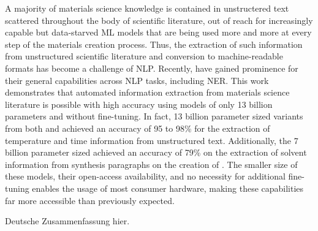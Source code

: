 \label{chap:abstract}

A majority of materials science knowledge is contained in unstructered text scattered throughout the body of scientific literature, out of reach for increasingly capable but data-starved \acrlong{ML} models that are being used more and more at every step of the materials creation process.
Thus, the extraction of such information from unstructured scientific literature and conversion to machine-readable formats has become a challenge of \acrlong{NLP}.
Recently,  have gained prominence for their general capabilities across \acrlong{NLP} tasks, including \acrlong{NER}.
This work demonstrates that automated information extraction from materials science literature is possible with high accuracy using models of only 13 billion parameters and without fine-tuning.
In fact, 13 billion parameter sized variants from both  and  achieved an accuracy of 95 to 98\% for the extraction of temperature and time information from unstructured text.
Additionally, the 7 billion parameter sized  achieved an accuracy of 79\% on the extraction of solvent information from synthesis paragraphs on the creation of .
The smaller size of these models, their open-access availability, and no necessity for additional fine-tuning enables the usage of most consumer hardware, making these capabilities far more accessible than previously expected.


Deutsche Zusammenfassung hier. 


\cleardoublepage



